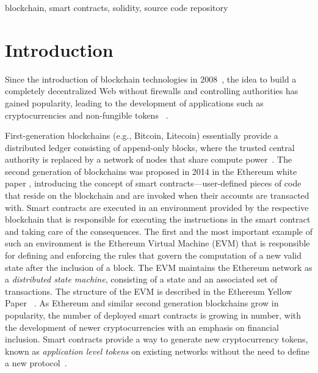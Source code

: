 \documentclass[10pt,conference]{IEEEtran}
\begin{document}
	\begin{IEEEkeywords}
		blockchain, smart contracts, solidity, source code repository
	\end{IEEEkeywords}
	
	\section{Introduction}
	\label{sec:intro}
	Since the introduction of blockchain technologies in 2008~\cite{bitcoinpaper}, the idea to build a completely decentralized Web without firewalls and controlling authorities has gained popularity, leading to the development of applications such as cryptocurrencies and non-fungible tokens ~\cite{crossblockchain}.
	
	First-generation blockchains (e.g., Bitcoin, Litecoin) essentially provide a distributed ledger consisting of append-only blocks, where the trusted central authority is replaced by a network of nodes that share compute power~\cite{blockchainsurvey}. The second generation of blockchains was proposed in 2014 in the Ethereum white paper \cite{ethpaper}, introducing the concept of smart contracts---user-defined pieces of code that reside on the blockchain and are invoked when their accounts are transacted with. Smart contracts are executed in an environment provided by the respective blockchain that is responsible for executing the instructions in the smart contract and taking care of the consequences. The first and the most important example of such an environment is the Ethereum Virtual Machine (EVM) that is responsible for defining and enforcing the rules that govern the computation of a new valid state after the inclusion of a block. The EVM maintains the Ethereum network as a \textit{distributed state machine}, consisting of a state and an associated set of transactions. The structure of the EVM is described in the Ethereum Yellow Paper ~\cite{wood2019ethereum}. As Ethereum and similar second generation blockchains grow in popularity, the number of deployed smart contracts is growing in number, with the development of newer cryptocurrencies with an emphasis on financial inclusion. Smart contracts provide a way to generate new cryptocurrency tokens, known as \textit{application level tokens} on existing networks without the need to define a new protocol~\cite{commonshood}. 
	
\end{document}
